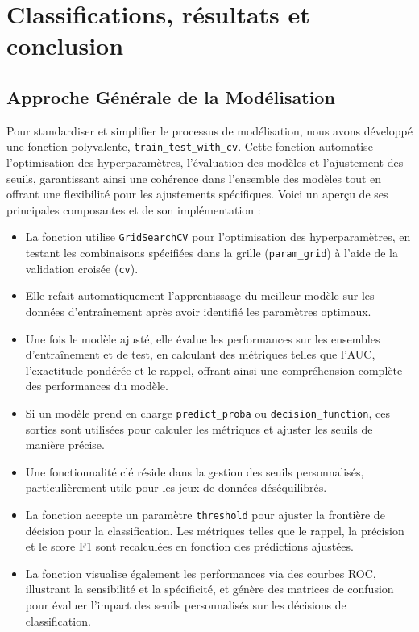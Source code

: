 \documentclass[a4paper,12pt]{report}
\begin{document}
\chapter{Classifications, résultats et conclusion}

\section{Approche Générale de la Modélisation}

Pour standardiser et simplifier le processus de modélisation, nous avons développé une fonction polyvalente, \texttt{train\_test\_with\_cv}. Cette fonction automatise l'optimisation des hyperparamètres, l'évaluation des modèles et l'ajustement des seuils, garantissant ainsi une cohérence dans l'ensemble des modèles tout en offrant une flexibilité pour les ajustements spécifiques. Voici un aperçu de ses principales composantes et de son implémentation :

\begin{itemize}
  \item La fonction utilise \texttt{GridSearchCV} pour l'optimisation des hyperparamètres, en testant les combinaisons spécifiées dans la grille (\texttt{param\_grid}) à l'aide de la validation croisée (\texttt{cv}).
  \item Elle refait automatiquement l'apprentissage du meilleur modèle sur les données d'entraînement après avoir identifié les paramètres optimaux.
  \item Une fois le modèle ajusté, elle évalue les performances sur les ensembles d'entraînement et de test, en calculant des métriques telles que l'AUC, l'exactitude pondérée et le rappel, offrant ainsi une compréhension complète des performances du modèle.
  \item Si un modèle prend en charge \texttt{predict\_proba} ou \texttt{decision\_function}, ces sorties sont utilisées pour calculer les métriques et ajuster les seuils de manière précise.
  \item Une fonctionnalité clé réside dans la gestion des seuils personnalisés, particulièrement utile pour les jeux de données déséquilibrés.
  \item La fonction accepte un paramètre \texttt{threshold} pour ajuster la frontière de décision pour la classification. Les métriques telles que le rappel, la précision et le score F1 sont recalculées en fonction des prédictions ajustées.
  \item La fonction visualise également les performances via des courbes ROC, illustrant la sensibilité et la spécificité, et génère des matrices de confusion pour évaluer l'impact des seuils personnalisés sur les décisions de classification.
\end{itemize}
\end{document}
